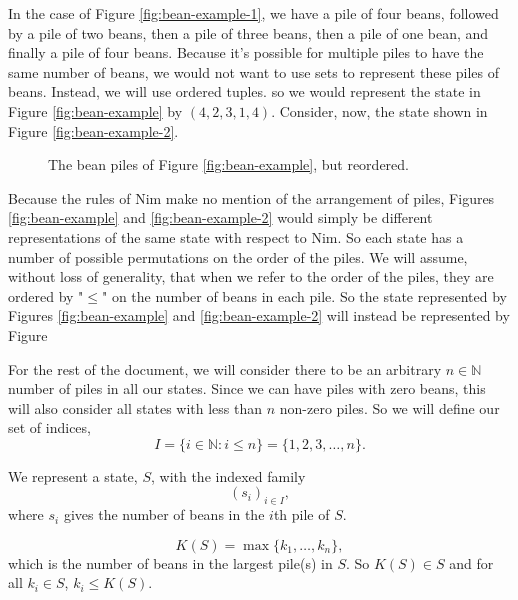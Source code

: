 \documentclass[12pt]{article}
\newcommand{\N}{\mathbb{N}}
\begin{document}
In the case of Figure \ref{fig:bean-example-1}, we have a pile of four beans, followed by a pile of two beans, then a pile of three beans, then a pile of one bean, and finally a pile of four beans. Because it's possible for multiple piles to have the same number of beans, we would not want to use sets to represent these piles of beans. Instead, we will use ordered tuples. so we would represent the state in Figure \ref{fig:bean-example} by $(4,2,3,1,4)$. Consider, now, the state shown in Figure \ref{fig:bean-example-2}.



\begin{figure}[ht]
    \centering
    \caption{The bean piles of Figure \ref{fig:bean-example}, but reordered.}
    \label{fig:bean-example-sort}
\end{figure}

Because the rules of Nim make no mention of the arrangement of piles, Figures \ref{fig:bean-example} and \ref{fig:bean-example-2} would simply be different representations of the same state with respect to Nim. So each state has a number of possible permutations on the order of the piles. We will assume, without loss of generality, that when we refer to the order of the piles, they are ordered by "$\leq$" on the number of beans in each pile. So the state represented by Figures \ref{fig:bean-example} and \ref{fig:bean-example-2} will instead be represented by Figure 



For the rest of the document, we will consider there to be an arbitrary $n\in\N$ number of piles in all our states. Since we can have piles with zero beans, this will also consider all states with less than $n$ non-zero piles. So we will define our set of indices,
\begin{equation}
    I = \{i\in\N: i\leq n\} = \{1, 2, 3, \dots, n\}.
\end{equation}

We represent a state, $S$, with the indexed family
\begin{equation}
    (s_i)_{i\in I},
\end{equation}
where $s_i$ gives the number of beans in the $i$th pile of $S$. 


\[K(S) = \max\{k_1,\dots,k_n\},\]
which is the number of beans in the largest pile(s) in $S$. So $K(S)\in S$ and for all $k_i\in S$, $k_i\leq K(S)$.
\end{document}
